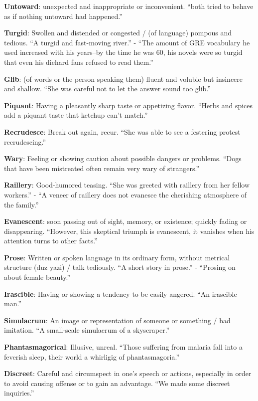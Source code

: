 \documentclass[12pt, a4paper]{ximera}
\begin{document}
\textbf{Untoward}: unexpected and inappropriate or inconvenient. ``both tried to behave as if nothing untoward had happened.''

\textbf{Turgid}: Swollen and distended or congested / (of language) pompous and tedious. ``A turgid and fast-moving river.'' - ``The amount of GRE vocabulary he used increased with his years--by the time he was 60, his novels were so turgid that even his diehard fans refused to read them.''

\textbf{Glib}: (of words or the person speaking them) fluent and voluble but insincere and shallow. ``She was careful not to let the answer sound too glib.''

\textbf{Piquant}: Having a pleasantly sharp taste or appetizing flavor. ``Herbs and spices add a piquant taste that ketchup can't match.''

\textbf{Recrudesce}: Break out again, recur. ``She was able to see a festering protest recrudescing.''

\textbf{Wary}: Feeling or showing caution about possible dangers or problems. ``Dogs that have been mistreated often remain very wary of strangers.''

\textbf{Raillery}: Good-humored teasing. ``She was greeted with raillery from her fellow workers.'' - ``A veneer of raillery does not evanesce the cherishing atmosphere of the family.''

\textbf{Evanescent}: soon passing out of sight, memory, or existence; quickly fading or disappearing. ``However, this skeptical triumph is evanescent, it vanishes when his attention turns to other facts.''

\textbf{Prose}: Written or spoken language in its ordinary form, without metrical structure (duz yazi) / talk tediously. ``A short story in prose.'' - ``Prosing on about female beauty.''

\textbf{Irascible}: Having or showing a tendency to be easily angered. ``An irascible man.''

\textbf{Simulacrum}: An image or representation of someone or something / bad imitation. ``A small-scale simulacrum of a skyscraper.''

\textbf{Phantasmagorical}: Illusive, unreal. ``Those suffering from malaria fall into a feverish sleep, their world a whirligig of phantasmagoria.''

\textbf{Discreet}: Careful and circumspect in one's speech or actions, especially in order to avoid causing offense or to gain an advantage. ``We made some discreet inquiries.''
\end{document}
